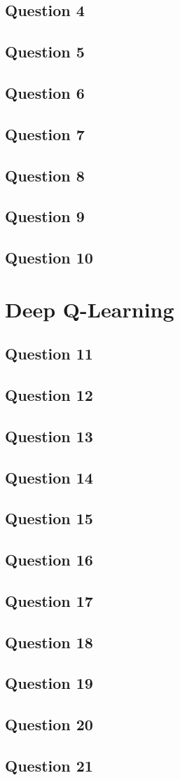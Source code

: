 \documentclass[10pt]{IEEEtran}
\begin{document}
\subsection*{Question 4}
\subsection*{Question 5}
\subsection*{Question 6}
\subsection*{Question 7}
\subsection*{Question 8}
\subsection*{Question 9}
\subsection*{Question 10}
\section{Deep Q-Learning}
\subsection*{Question 11}
\subsection*{Question 12}
\subsection*{Question 13}
\subsection*{Question 14}
\subsection*{Question 15}
\subsection*{Question 16}
\subsection*{Question 17}
\subsection*{Question 18}
\subsection*{Question 19}
\subsection*{Question 20}
\subsection*{Question 21}
\nocite{*}
\end{document}
